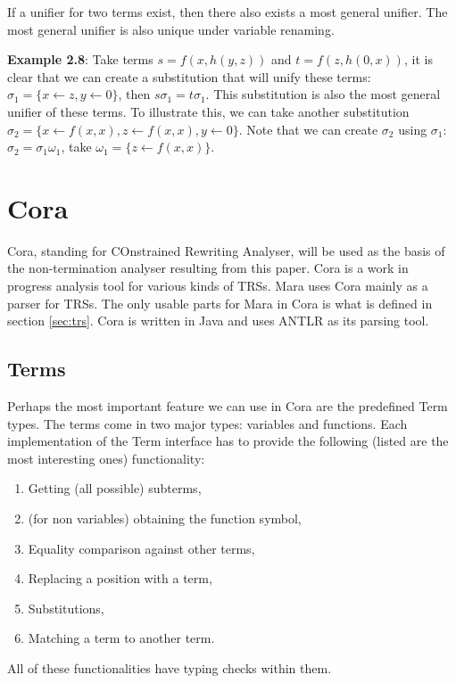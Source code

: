 If a unifier for two terms exist, then there also exists a most general unifier\cite{BUSS19981}. The most general unifier is also unique under variable renaming. 

\textbf{Example 2.8}: Take terms $s = f(x, h(y, z))$ and $t = f(z, h(0, x))$, it is clear that we can create a substitution that will unify these terms: $\sigma_1 = \{ x \leftarrow z, y \leftarrow 0 \}$, then $s\sigma_1 = t\sigma_1$. This substitution is also the most general unifier of these terms. To illustrate this, we can take another substitution $\sigma_2 = \{ x \leftarrow f(x, x), z \leftarrow f(x, x), y \leftarrow 0 \}$. Note that we can create $\sigma_2$ using $\sigma_1$: $\sigma_2 = \sigma_1\omega_1$, take $\omega_1 = \{ z \leftarrow f(x, x)\}$.

\section{Cora}
Cora, standing for COnstrained Rewriting Analyser\cite{Cora2019}, will be used as the basis of the non-termination analyser resulting from this paper. Cora is a work in progress analysis tool for various kinds of TRSs. Mara uses Cora mainly as a parser for TRSs. The only usable parts for Mara in Cora is what is defined in section \ref{sec:trs}. Cora is written in Java and uses ANTLR\cite{Parr:2013:DAR:2501720} as its parsing tool.

\subsection{Terms}
Perhaps the most important feature we can use in Cora are the predefined Term types. The terms come in two major types: variables and functions. Each implementation of the Term interface has to provide the following (listed are the most interesting ones) functionality: 
\begin{enumerate}
    \itemsep0em 
    \item Getting (all possible) subterms,
    \item (for non variables) obtaining the function symbol,
    \item Equality comparison against other terms,
    \item Replacing a position with a term,
    \item Substitutions,
    \item Matching a term to another term.
\end{enumerate}
All of these functionalities have typing checks within them. 
